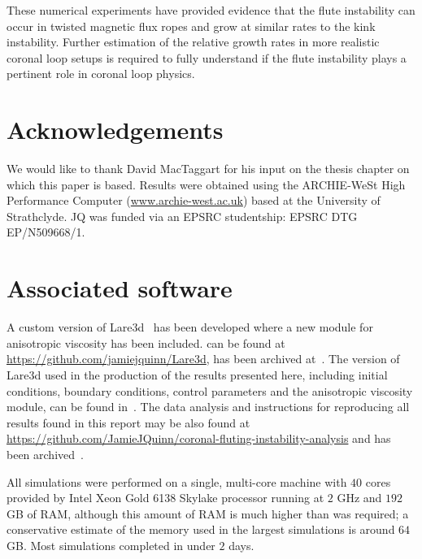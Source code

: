 \documentclass[fleqn,usenatbib]{mnras}
\newcommand{\rs}[2]{{#2}}
\begin{document}
These numerical experiments have provided evidence that the \rs{fluting}{flute} instability can occur in twisted magnetic flux ropes and grow at similar rates to the kink instability. Further estimation of the relative growth rates in more realistic coronal loop setups is required to fully understand if the \rs{fluting}{flute} instability plays a pertinent role in coronal loop physics.

\section*{Acknowledgements}

We would like to thank David MacTaggart for his input on the thesis chapter on which this paper is based. Results were obtained using the ARCHIE-WeSt High Performance Computer
(\url{www.archie-west.ac.uk}) based at the University of
Strathclyde. JQ was funded via an EPSRC studentship: EPSRC DTG EP/N509668/1.




\appendix

\section{Associated software}

A custom version of Lare3d~\citep{arberStaggeredGridLagrangian2001} has been developed where a new module for anisotropic viscosity has been included. \rs{The version including the new module}{} can be found at \url{https://github.com/jamiejquinn/Lare3d}, \rs{and also}{has been} archived at~\citep{keith_bennett_2020_4155546}. The version of Lare3d used in the production of the results presented here, including initial conditions, boundary conditions, control parameters and the anisotropic viscosity module, can be found in~\citep{keith_bennett_2020_4155625}. The data analysis and instructions for reproducing all results found in this report may be also found at \url{https://github.com/JamieJQuinn/coronal-fluting-instability-analysis} and has been archived~\citep{quinnJamieJQuinnCoronalflutinginstabilityanalysis2021}.

All simulations were performed on a single, multi-core machine with $40$ cores provided by Intel Xeon Gold 6138 Skylake processor running at $2$ GHz and $192$ GB of RAM, although this amount of RAM is much higher than was required; a conservative estimate of the memory used in the largest simulations is around $64$ GB. Most simulations completed in under $2$ days.

\bsp	%
\label{lastpage}
\end{document}
